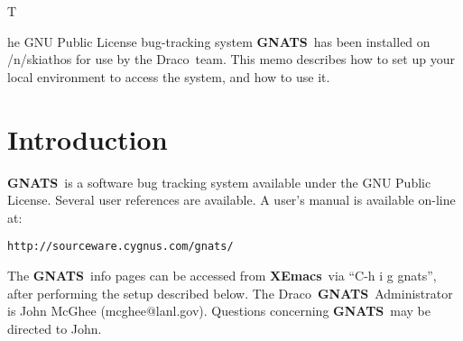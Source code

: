 \documentclass[11pt]{nmemo}
\newcommand{\draco}{{\normalfont\sffamily Draco}}
\newcommand{\xemacs}{{\normalfont\bfseries XEmacs}}
\newcommand{\gnats}{{\normalfont\bfseries GNATS}}
\begin{document}

\subject{\gnats\ Bug Tracking System}

\date{\today}





\opening

The GNU Public License bug-tracking system \gnats\ has been 
installed on /n/skiathos for use by the \draco\ team. This memo
describes how to set up your local environment to access the 
system, and how to use it.


\section{Introduction}

\gnats\ is a software bug tracking system available under
the GNU Public License. Several user references are available.
A user's manual is available on-line at:
\begin{verbatim}
http://sourceware.cygnus.com/gnats/
\end{verbatim}
The \gnats\ info pages can be accessed from \xemacs\ via ``C-h i g gnats'',
after performing the setup described below.
The \draco\ \gnats\ Administrator is John McGhee (mcghee@lanl.gov).
Questions concerning \gnats\ may be directed to John.
\end{document}
